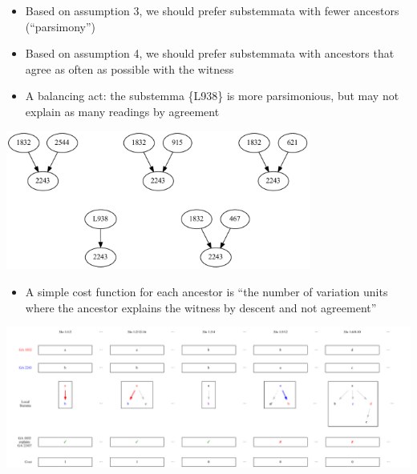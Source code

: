 \documentclass[10pt]{beamer}
\begin{document}
	\begin{frame}
		\begin{itemize}
			\item Based on assumption 3, we should prefer substemmata with fewer ancestors (``parsimony'')
			\item Based on assumption 4, we should prefer substemmata with ancestors that agree as often as possible with the witness
			\item A balancing act: the substemma \{L938\} is more parsimonious, but may not explain as many readings by agreement
		\end{itemize}
		\begin{center}
			\includegraphics[width=0.75\textwidth]{../img/substemmata.pdf}
		\end{center}
	\end{frame}
	\begin{frame}
		\begin{itemize}
			\item A simple cost function for each ancestor is ``the number of variation units where the ancestor explains the witness by descent and not agreement''
		\end{itemize}
		\begin{center}
			\includegraphics[width=\textwidth]{../img/explained-readings-costs.pdf}
		\end{center}
	\end{frame}
\end{document}
